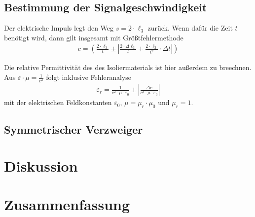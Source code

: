 \documentclass{article}
\begin{document}
\subsection{Bestimmung der Signalgeschwindigkeit}

Der elektrische Impuls legt den Weg $s = 2\cdot \ell_3$ zurück. Wenn dafür die Zeit $t$ benötigt wird, dann gilt insgesamt mit Größtfehlermethode
\begin{align*}
c = \left(\frac{2\cdot \ell_3}{t} \pm \left|\frac{2\cdot \Delta \ell_3}{t} + \frac{2\cdot \ell_3}{t^2}\cdot \Delta t\right|\right)
\end{align*}

Die relative Permittivität des des Isoliermaterials ist hier außerdem zu breechnen. Aus $\varepsilon \cdot \mu = \frac{1}{c^2}$ folgt inklusive Fehleranalyse
\begin{align*}
\varepsilon_r = \frac{1}{c^2\cdot \mu\cdot \varepsilon_0} \pm \left| \frac{\Delta c}{c^3\cdot \mu\cdot \varepsilon_0} \right|
\end{align*}
mit der elektrischen Feldkonstanten $\varepsilon_0$, $\mu = \mu_r\cdot\mu_0$ und $\mu_r=1$.

\subsection{Symmetrischer Verzweiger}




\section{Diskussion}






\section{Zusammenfassung}








%
\end{document}
